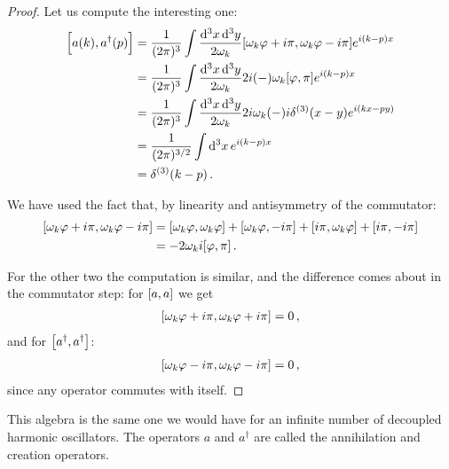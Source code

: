 \documentclass[main.tex]{subfiles}
\begin{document}
\begin{proof}
Let us compute the interesting one: 
%
\begin{subequations}
\begin{align}
\qty[a(k), a ^\dag (p)] &= \frac{1}{(2\pi )^3} \int \frac{ \dd[3]{x} \dd[3]{y}}{2 \omega_{k}}
\qty[\omega_{k} \varphi + i \pi, \omega_{k} \varphi - i \pi ] e^{i(k-p)x}  \\
&= \frac{1}{(2\pi )^3} \int \frac{ \dd[3]{x} \dd[3]{y}}{2 \omega_{k}}
2 i (-) \omega_{k} \qty[ \varphi, \pi ] e^{i(k-p)x}  \\
&= \frac{1}{(2\pi )^3} \int \frac{ \dd[3]{x} \dd[3]{y}}{2 \omega_{k}}
2 i \omega_{k} (-) i \delta^{(3)} (x - y) e^{i(kx-py)}  \\
&= \frac{1}{(2\pi )^{3/2}} \int \dd[3]{x} e^{i(k-p)x}  \\
&= \delta^{(3)} (k-p) \label{eq:commutator-annihilation-creation-operators}
\,.
\end{align}
\end{subequations}

We have used the fact that, by linearity and antisymmetry of the commutator:
%
\begin{subequations}
\begin{align}
\qty[\omega_{k} \varphi + i \pi, \omega_{k} \varphi - i \pi ] 
&= \qty[\omega_{k} \varphi , \omega_{k} \varphi ]+ \qty[\omega_{k} \varphi , -i \pi ] + \qty[i \pi, \omega_{k} \varphi ] + \qty[i \pi , -i \pi ]  \\
&= -2 \omega_{k} i \qty[\varphi , \pi ]
\,.
\end{align}
\end{subequations}

For the other two the computation is similar, and the difference comes about in the commutator step: for \(\qty[a, a]\) we get
%
\begin{align}
\qty[\omega_{k} \varphi + i \pi, \omega_{k} \varphi + i \pi ] = 0
\,,
\end{align}
%
and for \(\qty[a ^\dag, a ^\dag]\): 
%
\begin{align}
\qty[\omega_{k} \varphi - i \pi, \omega_{k} \varphi - i \pi ] = 0
\,,
\end{align}
%
since any operator commutes with itself.
\end{proof}

This algebra is the same one we would have for an infinite number of decoupled harmonic oscillators.  
The operators \(a\) and \(a ^\dag\) are called the annihilation and creation operators. 
\end{document}
